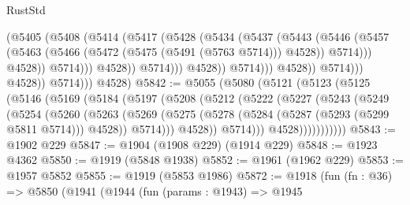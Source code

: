 \begin{lexlean}{RustStd}
\begin{coremodule}
                                        (@5405
                                          (@5408
                                            (@5414
                                              (@5417
                                                (@5428
                                                  (@5434
                                                    (@5437
                                                      (@5443
                                                        (@5446
                                                          (@5457
                                                            (@5463
                                                              (@5466
                                                                (@5472
                                                                  (@5475 (@5491 (@5763 @5714)))
                                                                  @4528))
                                                              @5714)))
                                                        @4528))
                                                    @5714)))
                                              @4528))
                                          @5714)))
                                    @4528))
                                @5714)))
                          @4528))
                      @5714)))
                @4528))
            @5714)))
      @4528)
@5842 := @5055
    (@5080
      (@5121
        (@5123
          (@5125
            (@5146
              (@5169
                (@5184
                  (@5197
                    (@5208
                      (@5212
                        (@5222
                          (@5227
                            (@5243
                              (@5249
                                (@5254
                                  (@5260
                                    (@5263
                                      (@5269
                                        (@5275
                                          (@5278 (@5284 (@5287 (@5293 (@5299 @5811 @5714))) @4528))
                                          @5714)))
                                    @4528))
                                @5714)))
                          @4528)))))))))))
@5843 := @1902 @229
@5847 := @1904 (@1908 @229) (@1914 @229)
@5848 := @1923 @4362
@5850 := @1919 (@5848 @1938)
@5852 := @1961 (@1962 @229)
@5853 := @1957 @5852
@5855 := @1919 (@5853 @1986)
@5872 := @1918
    (fun (fn : @36) =>
    @5850
      (@1941
        (@1944
          (fun (params : @1943) =>
          @1945

\end{coremodule}
\end{lexlean}
